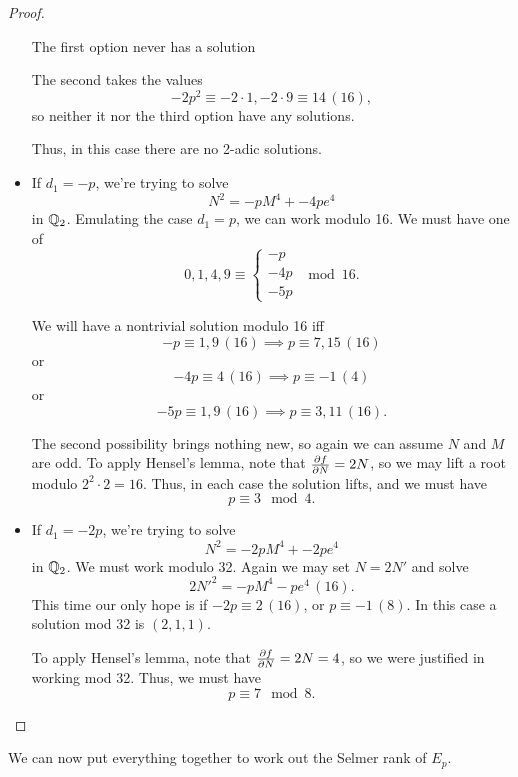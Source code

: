 \documentclass[12pt, a4paper]{report}
\begin{document}
\begin{proof}
\begin{itemize}
    The first option never has a solution

    The second takes the values
    \[-2p^2 \equiv -2\cdot 1, -2 \cdot 9 \equiv 14 \, (16), \]
    so neither it nor the third option have any solutions.

    Thus, in this case there are no 2-adic solutions.

    \item If $d_1 = -p$, we're trying to solve
      \[N^2 = -pM^4 + -4pe^4 \] in ${\mathbb Q}_2$. Emulating the case $d_1 = p$, we
      can work modulo 16.
    We must have one of
    \[0, 1, 4, 9 \equiv
      \begin{cases}
        -p \\
        -4p \\
        -5p
      \end{cases} \mod{16}.
    \]

    We will have a nontrivial solution modulo 16 iff 
    \[-p \equiv 1,9 \, (16) \implies p \equiv 7, 15 \, (16)\]
    or
    \[-4p \equiv 4 \, (16) \implies p \equiv -1 \, (4)\]
    or
    \[-5p \equiv 1,9 \, (16) \implies p \equiv 3, 11 \, (16).\]

    The second possibility brings nothing new, so again we can assume $N$ and
    $M$ are odd. To apply Hensel's lemma, note that $\frac{\partial f}{\partial N} = 2N$, so we
    may lift a root modulo $2^2 \cdot 2 = 16$. Thus, in each case the solution
    lifts, and we must have
    \[p \equiv 3 \mod{4}.\]

    \item If $d_1 = -2p$, we're trying to solve
    \[N^2 = -2pM^4 + -2pe^4 \] in ${\mathbb Q}_2$. 
    We must work modulo 32. Again we may set $N = 2N'$ and solve
    \[2N'^2 = -pM^4 - pe^4 \, (16).\]
    This time our only hope is if $-2p \equiv 2 \, (16)$, or $p \equiv -1 \, (8).$
    In this case a solution mod 32 is $(2,1,1).$

    To apply Hensel's lemma, note that $\frac{\partial f}{\partial N} = 2N = 4$, so we were
    justified in working mod 32. Thus, we must have
    \[p \equiv 7 \mod{8}.\]

  \end{itemize}
\end{proof}
We can now put everything together to work out the Selmer rank of $E_p$.
\end{document}
